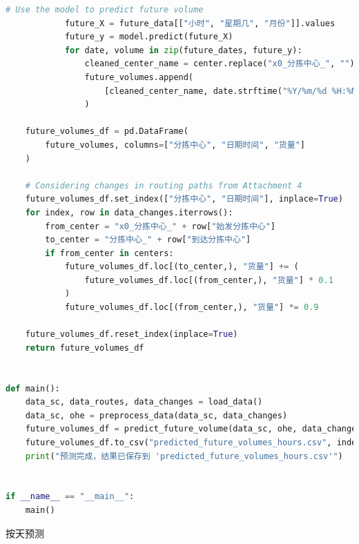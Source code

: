\documentclass[UTF8]{article}%
\begin{document}
\begin{lstlisting}[language=python]
            # Use the model to predict future volume
            future_X = future_data[["小时", "星期几", "月份"]].values
            future_y = model.predict(future_X)
            for date, volume in zip(future_dates, future_y):
                cleaned_center_name = center.replace("x0_分拣中心_", "")
                future_volumes.append(
                    [cleaned_center_name, date.strftime("%Y/%m/%d %H:%M"), volume]
                )

    future_volumes_df = pd.DataFrame(
        future_volumes, columns=["分拣中心", "日期时间", "货量"]
    )

    # Considering changes in routing paths from Attachment 4
    future_volumes_df.set_index(["分拣中心", "日期时间"], inplace=True)
    for index, row in data_changes.iterrows():
        from_center = "x0_分拣中心_" + row["始发分拣中心"]
        to_center = "分拣中心_" + row["到达分拣中心"]
        if from_center in centers:
            future_volumes_df.loc[(to_center,), "货量"] += (
                future_volumes_df.loc[(from_center,), "货量"] * 0.1
            )
            future_volumes_df.loc[(from_center,), "货量"] *= 0.9

    future_volumes_df.reset_index(inplace=True)
    return future_volumes_df


def main():
    data_sc, data_routes, data_changes = load_data()
    data_sc, ohe = preprocess_data(data_sc, data_changes)
    future_volumes_df = predict_future_volume(data_sc, ohe, data_changes)
    future_volumes_df.to_csv("predicted_future_volumes_hours.csv", index=False)
    print("预测完成，结果已保存到 'predicted_future_volumes_hours.csv'")


if __name__ == "__main__":
    main()
\end{lstlisting}
\noindent 按天预测
\end{document}
